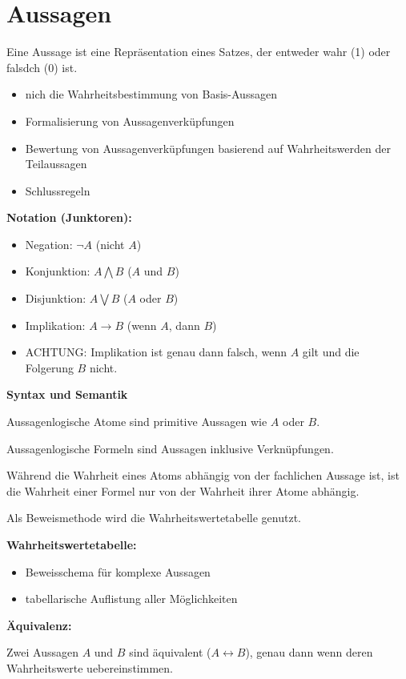\documentclass[diskretestrukturen.tex]{subfiles}
\begin{document}
  \section{Aussagen}
  \begin{definition}[Aussage]
    Eine Aussage ist eine Repr\"asentation eines Satzes, der entweder wahr (1) oder falsdch (0) ist.
  \end{definition}

  \begin{description}
    \begin{itemize}
      \item nich die Wahrheitsbestimmung von Basis-Aussagen
      \item Formalisierung von Aussagenverk\"upfungen
      \item Bewertung von Aussagenverk\"upfungen basierend auf Wahrheitswerden der Teilaussagen
      \item Schlussregeln
    \end{itemize}
    \item \textbf{Notation (Junktoren):}
    \begin{itemize}
      \item Negation: $\neg A$ (nicht $A$)
      \item Konjunktion: $A \bigwedge B$ ($A$ und $B$)
      \item Disjunktion: $A \bigvee B$ ($A$ oder $B$)
      \item Implikation:  $A \rightarrow B$ (wenn $A$, dann $B$)
      \item ACHTUNG: Implikation ist genau dann falsch, wenn $A$ gilt und die Folgerung $B$ nicht.
    \end{itemize}
    \item \textbf{Syntax und Semantik}
    \begin{definition}
      Aussagenlogische Atome sind primitive Aussagen wie $A$ oder $B$.

      Aussagenlogische Formeln sind Aussagen inklusive Verkn\"upfungen.


      W\"ahrend die Wahrheit eines Atoms abh\"angig von der fachlichen Aussage ist, ist die Wahrheit einer Formel nur von der Wahrheit
      ihrer Atome abh\"angig.

      Als Beweismethode wird die Wahrheitswertetabelle genutzt.
    \end{definition}
    \item \textbf{Wahrheitswertetabelle:}
    \begin{itemize}
      \item Beweisschema f\"ur komplexe Aussagen
      \item tabellarische Auflistung aller M\"oglichkeiten
    \end{itemize}
    \item \textbf{\"Aquivalenz:}
    \begin{definition}[\"Aquivalenz]
      Zwei Aussagen $A$ und $B$ sind \"aquivalent ($A \leftrightarrow B$), genau dann wenn deren Wahrheitswerte uebereinstimmen.
    \end{definition}



\end{description}
\end{document}
